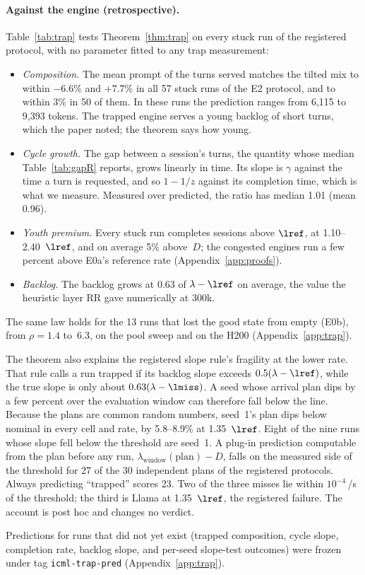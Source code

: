 \paragraph{Against the engine (retrospective).} Table~\ref{tab:trap} tests Theorem~\ref{thm:trap} on every stuck run of the
registered protocol, with no parameter fitted to any trap measurement:
\begin{itemize}[leftmargin=*,nosep]
\item \emph{Composition.} The mean prompt of the turns served matches the tilted mix to within $-6.6$\% and $+7.7$\% in all
57 stuck runs of the E2 protocol, and to within 3\% in 50 of them. In these runs the prediction ranges from 6{,}115 to
9{,}393 tokens. The trapped engine serves a young backlog of short turns, which the paper noted; the theorem says how young.
\item \emph{Cycle growth.} The gap between a session's turns, the quantity whose median Table~\ref{tab:gapR} reports,
grows linearly in time. Its slope is $\gamma$ against the time a turn is requested, and so $1-1/z$ against its completion
time, which is what we measure. Measured over predicted, the ratio has median 1.01 (mean 0.96).
\item \emph{Youth premium.} Every stuck run completes sessions above $\lref$, at 1.10--2.40~$\lref$, and on average 5\%
above~$D$; the congested engines run a few percent above E0a's reference rate (Appendix~\ref{app:proofs}).
\item \emph{Backlog.} The backlog grows at 0.63 of $\lambda-\lref$ on average, the value the heuristic layer RR gave
numerically at 300k.
\end{itemize}
The same law holds for the 13 runs that lost the good state from empty (E0b), from $\rho=1.4$ to~6.3, on the pool sweep
and on the H200 (Appendix~\ref{app:trap}).

The theorem also explains the registered slope rule's fragility at the lower rate. That rule calls a run trapped if its
backlog slope exceeds $0.5(\lambda-\lref)$, while the true slope is only about $0.63(\lambda-\lmiss)$. A seed whose arrival
plan dips by a few percent over the evaluation window can therefore fall below the line. Because the plans are common random
numbers, seed~1's plan dips below nominal in every cell and rate, by 5.8--8.9\% at 1.35~$\lref$. Eight of the nine runs whose
slope fell below the threshold are seed~1. A plug-in prediction computable from the plan before any run,
$\lambda_{\mathrm{window}}(\text{plan})-D$, falls on the measured side of the threshold for 27 of the 30 independent plans
of the registered protocols. Always predicting ``trapped'' scores 23. Two of the three misses lie within $10^{-4}$\,/s of
the threshold; the third is Llama at 1.35~$\lref$, the registered failure. The account is post hoc and changes no verdict.

Predictions for runs that did not yet exist (trapped composition, cycle slope, completion rate, backlog slope, and per-seed
slope-test outcomes) were frozen under tag \texttt{icml-trap-pred} (Appendix~\ref{app:trap}).
